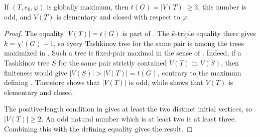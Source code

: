 \begin{lemma}
If $(T,e_0,\varphi)$ is globally maximum, then
$t(G)=|V(T)|\geq3$, this number is odd, and $V(T)$ is elementary and
closed with respect to $\varphi$.
\end{lemma}
\begin{proof}
The equality $|V(T)|=t(G)$ is part of
.  The $k$-triple equality there gives
$k=\chi'(G)-1$, so every Tashkinov tree for the same pair is among the
trees maximized in .  Such a tree is fixed-pair
maximal in the sense of .  Indeed,
if a Tashkinov tree $S$ for the same pair strictly contained $V(T)$ in
$V(S)$, then finiteness would give $|V(S)|>|V(T)|=t(G)$, contrary to the
maximum defining .  Therefore
 shows that $|V(T)|$ is odd, while
 shows that $V(T)$ is elementary
and closed.

The positive-length condition in  gives at least the
two distinct initial vertices, so $|V(T)|\geq2$.  An odd natural number
which is at least two is at least three.  Combining this with the defining
equality gives the result.
\end{proof}
